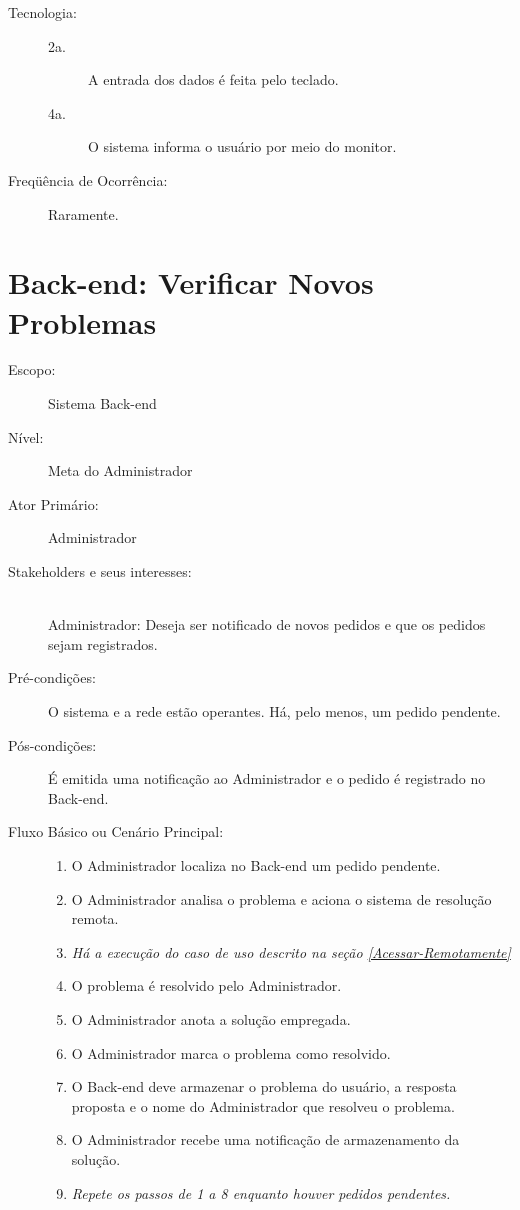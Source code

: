 \documentclass[brazil,times]{abnt}
\begin{document}
\begin{description}
\item[Tecnologia:] \hfill
\begin{description} 
	\item[2a.] A entrada dos dados é feita pelo teclado.
	\item[4a.] O sistema informa o usuário por meio do monitor.
\end{description}
\item[Freqüência de Ocorrência:] Raramente.

\end{description}



\section{Back-end: Verificar Novos Problemas}
\begin{description}
\item[Escopo:] Sistema Back-end
\item[Nível:] Meta do Administrador
\item[Ator Primário:] Administrador
\item[Stakeholders e seus interesses:] \hfill \\
Administrador: Deseja ser notificado de novos pedidos e que os pedidos
sejam registrados.
\item[Pré-condições:] O sistema e a rede estão operantes. Há, pelo menos, um pedido 
pendente.
\item[Pós-condições:]  É emitida uma notificação ao Administrador e o pedido é        
registrado no Back-end.
\item[Fluxo Básico ou Cenário Principal:]\hfill
\begin{enumerate}
  \item O Administrador localiza no Back-end um pedido pendente.
  \item O Administrador analisa o problema e aciona o sistema de resolução
  remota.
  \item \emph{Há a execução do caso de uso descrito na seção \ref{Acessar-Remotamente}}
  \item O problema é resolvido pelo Administrador.
  \item O Administrador anota a solução empregada.
  \item O Administrador marca o problema como resolvido.
  \item O Back-end deve armazenar o problema do usuário, a resposta proposta e
  o nome do Administrador que resolveu o problema.
  \item O Administrador recebe uma notificação de armazenamento da solução.
  \item \emph{Repete os passos de 1 a 8 enquanto houver pedidos pendentes.}
\end{enumerate}


\end{description}
\end{document}
